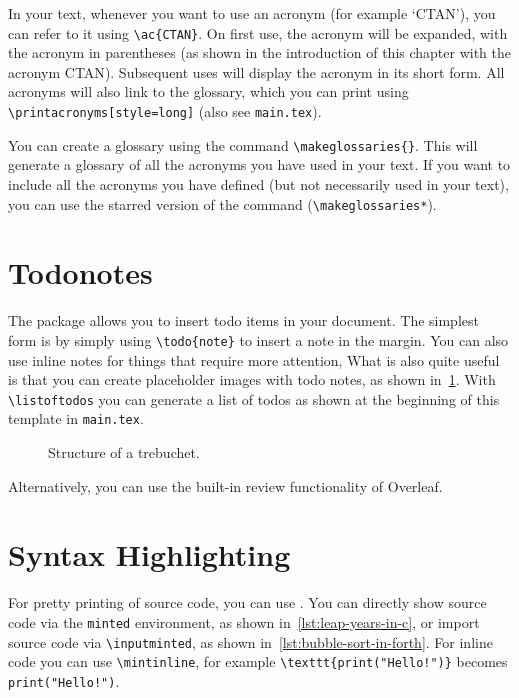 In your text, whenever you want to use an acronym (for example `\ac{CTAN}'), you can refer to it using \verb|\ac{CTAN}|.
On first use, the acronym will be expanded, with the acronym in parentheses (as shown in the introduction of this chapter with the acronym \ac{CTAN}).
Subsequent uses will display the acronym in its short form.
All acronyms will also link to the glossary, which you can print using \verb|\printacronyms[style=long]| (also see \verb|main.tex|).

You can create a glossary using the command \verb|\makeglossaries{}|. This will generate a glossary of all the acronyms you have used in your text. If you want to include all the acronyms you have defined (but not necessarily used in your text), you can use the starred version of the command (\ie \verb|\makeglossaries*|).

\section{Todonotes}

The package  allows you to insert todo items in your document.
The simplest form is by simply using \verb+\todo{note}+ to insert a note in the margin.
You can also use inline notes for things that require more attention, 
What is also quite useful is that you can create placeholder images with todo notes, as shown in~\cref{fig:missing-figure}.
With \verb+\listoftodos+ you can generate a list of todos as shown at the beginning of this template in \verb+main.tex+.

\begin{figure}
    \centering
    \caption{Structure of a trebuchet.}
    \label{fig:missing-figure}
\end{figure}

Alternatively, you can use the built-in review functionality of Overleaf.

\section{Syntax Highlighting}
For pretty printing of source code, you can use .
You can directly show source code via the \verb|minted| environment, as shown in~\cref{lst:leap-years-in-c}, or import source code via \verb|\inputminted|, as shown in~\cref{lst:bubble-sort-in-forth}.
For inline code you can use \verb|\mintinline|, for example \verb|\texttt{print("Hello!")}| becomes \texttt{print("Hello!")}.

